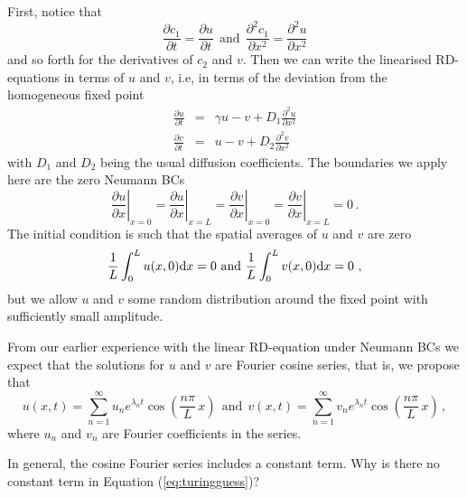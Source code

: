 First, notice that 
\begin{equation}
	\frac{\partial c_1}{\partial t} = \frac{\partial u}{\partial t} \ \ \text{and} \ \ 
	\frac{\partial^2 c_1}{\partial x^2} = \frac{\partial^2 u}{\partial x^2}
\end{equation}
and so forth for the derivatives of $c_2$ and $v$. Then we can write the linearised 
RD-equations in terms of $u$ and $v$, i.e, in terms of the deviation from the homogeneous fixed point
\begin{eqnarray}
	\label{eq:fhnlin1}
	\frac{\partial u}{\partial t} &=& \gamma u - v + D_1 \frac{\partial^2 u}{\partial x^2}\\
	\label{eq:fhnlin2}
	\frac{\partial v}{\partial t} &=& u-v + D_2 \frac{\partial^2 v}{\partial x^2}
\end{eqnarray}
with $D_1$ and $D_2$ being the usual diffusion coefficients. The boundaries we apply here are the zero Neumann BCs 
\begin{equation}
	\left.\frac{\partial u}{\partial x}\right|_{x=0} = \left.\frac{\partial u}{\partial x}\right|_{x=L} = \left.\frac{\partial v}{\partial x}\right|_{x=0} = \left.\frac{\partial v}{\partial x}\right|_{x=L} = 0 \, .
\end{equation}
The initial condition is such that the spatial averages of $u$ and $v$ are zero
\begin{eqnarray}
	\frac{1}{L} \int_0^L u(x,0) \mathrm{d} x = 0 \text{ and } \frac{1}{L}\int_0^L v(x,0) \mathrm{d} x = 0 \ ,
\end{eqnarray}
but we allow $u$ and $v$ some random distribution around the fixed point with sufficiently small amplitude. 

From our earlier experience with the linear RD-equation under Neumann BCs 
we expect that the solutions for $u$ and $v$ are Fourier cosine series, that is, we propose that  
\begin{equation}
\label{eq:turingguess}
	u(x,t) = \sum_{n=1}^\infty u_n e^{\lambda_n t}\cos\left(\frac{n\pi}{L} \, x\right) \ \ \text{and} 
	\ \ v(x,t) = \sum_{n=1}^\infty v_n e^{\lambda_n t}\cos\left(\frac{n\pi}{L} \, x\right) \, ,
\end{equation}
where $u_n$ and $v_n$ are Fourier coefficients in the series. 

\begin{question}
	In general, the cosine Fourier series includes a constant term. Why is there no constant term in Equation (\ref{eq:turingguess})?
\end{question}

